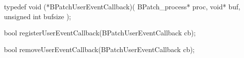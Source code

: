 \begin{apient}
  typedef void (*BPatchUserEventCallback)(
    BPatch_process* proc,
    void* buf,
    unsigned int bufsize
  );
\end{apient}

\begin{apient}
  bool registerUserEventCallback(BPatchUserEventCallback cb);
\end{apient}


\begin{apient}
  bool removeUserEventCallback(BPatchUserEventCallback cb);
\end{apient}


